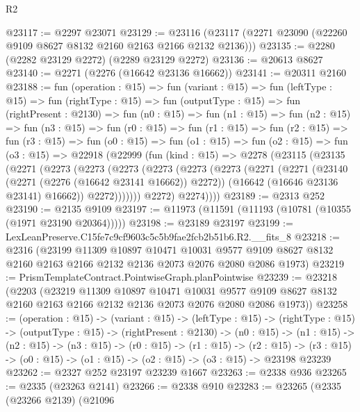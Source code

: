\begin{lexlean}{R2}
\begin{coremodule}
@23117 := @2297 @23071
@23129 := @23116 (@23117 (@2271 @23090 (@22260 @9109 @8627 @8132 @2160 @2163 @2166 @2132 @2136)))
@23135 := @2280 (@2282 @23129 @2272) (@2289 @23129 @2272)
@23136 := @20613 @8627
@23140 := @2271 (@2276 (@16642 @23136 @16662))
@23141 := @20311 @2160
@23188 := fun (operation : @15) =>
  fun (variant : @15) =>
  fun (leftType : @15) =>
  fun (rightType : @15) =>
  fun (outputType : @15) =>
  fun (rightPresent : @2130) =>
  fun (n0 : @15) =>
  fun (n1 : @15) =>
  fun (n2 : @15) =>
  fun (n3 : @15) =>
  fun (r0 : @15) =>
  fun (r1 : @15) =>
  fun (r2 : @15) =>
  fun (r3 : @15) =>
  fun (o0 : @15) =>
  fun (o1 : @15) =>
  fun (o2 : @15) =>
  fun (o3 : @15) =>
  @22918
    (@22999
      (fun (kind : @15) =>
      @2278
        (@23115
          (@23135
            (@2271
              (@2273
                (@2273
                  (@2273
                    (@2273
                      (@2273
                        (@2273
                          (@2271
                            (@2271
                              (@23140 (@2271 (@2276 (@16642 @23141 @16662)) @2272))
                              (@16642 (@16646 @23136 @23141) @16662))
                            @2272)))))))
              @2272)
            @2274))))
@23189 := @2313 @252
@23190 := @2135 @9109
@23197 := @11973 (@11591 (@11193 (@10781 (@10355 (@1971 @23190 @20364)))))
@23198 := @23189 @23197
@23199 := LexLeanPreserve.C15fe7c9cf9603c5c5b9fae2fcb2b51b6.R2.__fits_8
@23218 := @2316
    (@23199
      @11309
      @10897
      @10471
      @10031
      @9577
      @9109
      @8627
      @8132
      @2160
      @2163
      @2166
      @2132
      @2136
      @2073
      @2076
      @2080
      @2086
      @1973)
@23219 := PrismTemplateContract.PointwiseGraph.planPointwise
@23239 := @23218
    (@2203
      (@23219
        @11309
        @10897
        @10471
        @10031
        @9577
        @9109
        @8627
        @8132
        @2160
        @2163
        @2166
        @2132
        @2136
        @2073
        @2076
        @2080
        @2086
        @1973))
@23258 := (operation : @15) ->
  (variant : @15) ->
  (leftType : @15) ->
  (rightType : @15) ->
  (outputType : @15) ->
  (rightPresent : @2130) ->
  (n0 : @15) ->
  (n1 : @15) ->
  (n2 : @15) ->
  (n3 : @15) ->
  (r0 : @15) ->
  (r1 : @15) ->
  (r2 : @15) -> (r3 : @15) -> (o0 : @15) -> (o1 : @15) -> (o2 : @15) -> (o3 : @15) -> @23198 @23239
@23262 := @2327 @252 @23197 @23239 @1667
@23263 := @2338 @936
@23265 := @2335 (@23263 @2141)
@23266 := @2338 @910
@23283 := @23265
    (@2335
      (@23266 @2139)
      (@21096

\end{coremodule}
\end{lexlean}
